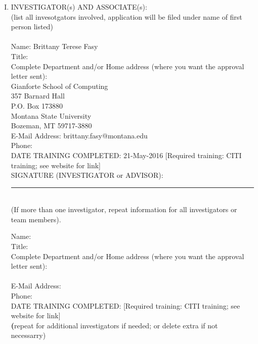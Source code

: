 \documentclass{article}
\newcommand{\response}[1]{{\color{blue}#1}}
\begin{document}
\begin{enumerate}[I.]
  
    \item INVESTIGATOR(s) AND ASSOCIATE(s):\\
        (list all invesotgators involved, application will be filed under name of first\\
        person listed)\\
        \\
        Name: \response{Brittany Terese Fasy}\\
        Title: \\
        Complete Department and/or Home address (where you want the approval
        letter sent):\\
            \response{
            Gianforte School of Computing\\
            357 Barnard Hall\\
            P.O. Box 173880\\
            Montana State University\\
            Bozeman, MT 59717-3880}\\
        E-Mail Address: \response{brittany.fasy@montana.edu}\\
        Phone: \\
        DATE TRAINING COMPLETED: \response{21-May-2016} [Required training: CITI
        training; see website for link]\\
        
        
        SIGNATURE (INVESTIGATOR or ADVISOR):\rule{0.5\linewidth}{\linethickness}   \\

        (If more than one investigator, repeat information for all investigators
        or team members).

        Name: \\
        Title: \\
        Complete Department and/or Home address (where you want the approval
        letter sent):\\
            \\
        E-Mail Address: \\
        Phone: \\
        DATE TRAINING COMPLETED: [Required training: CITI
        training; see website for link]\\
        
        \textbf(repeat for additional investigators if needed; or delete extra if not necessarry)\\


\end{enumerate}
\end{document}
